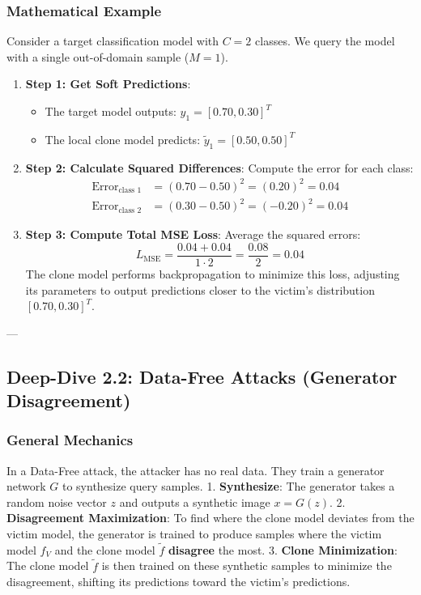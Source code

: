 \documentclass{article}
\begin{document}
\subsubsection{Mathematical Example}
Consider a target classification model with $C=2$ classes. We query the model with a single out-of-domain sample ($M=1$).
\begin{enumerate}
    \item \textbf{Step 1: Get Soft Predictions}: 
    \begin{itemize}
        \item The target model outputs: $y_1 = [0.70, 0.30]^T$
        \item The local clone model predicts: $\tilde{y}_1 = [0.50, 0.50]^T$
    \end{itemize}
    
    \item \textbf{Step 2: Calculate Squared Differences}: Compute the error for each class:
    \begin{align*}
        \text{Error}_{\text{class 1}} &= (0.70 - 0.50)^2 = (0.20)^2 = 0.04 \\
        \text{Error}_{\text{class 2}} &= (0.30 - 0.50)^2 = (-0.20)^2 = 0.04
    \end{align*}
    
    \item \textbf{Step 3: Compute Total MSE Loss}: Average the squared errors:
    $$L_{\text{MSE}} = \frac{0.04 + 0.04}{1 \cdot 2} = \frac{0.08}{2} = 0.04$$
    The clone model performs backpropagation to minimize this loss, adjusting its parameters to output predictions closer to the victim's distribution $[0.70, 0.30]^T$.
\end{enumerate}

---

\subsection{Deep-Dive 2.2: Data-Free Attacks (Generator Disagreement)}

\subsubsection{General Mechanics}
In a Data-Free attack, the attacker has no real data. They train a generator network $G$ to synthesize query samples. 
1. \textbf{Synthesize}: The generator takes a random noise vector $z$ and outputs a synthetic image $x = G(z)$.
2. \textbf{Disagreement Maximization}: To find where the clone model deviates from the victim model, the generator is trained to produce samples where the victim model $f_V$ and the clone model $\tilde{f}$ \textbf{disagree} the most.
3. \textbf{Clone Minimization}: The clone model $\tilde{f}$ is then trained on these synthetic samples to minimize the disagreement, shifting its predictions toward the victim's predictions.
\end{document}
